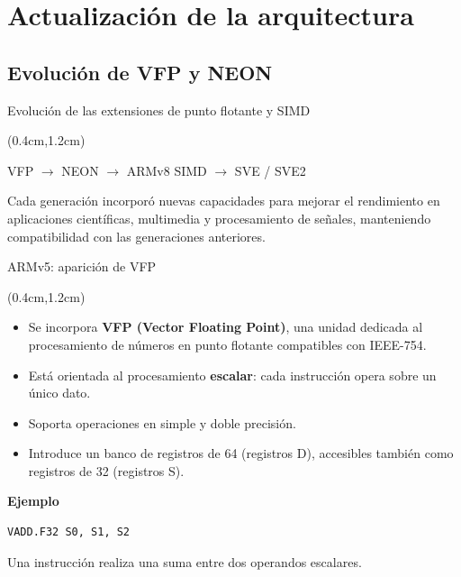 \section{Actualización de la arquitectura}
\subsection{Evolución de VFP y NEON}

\begin{frame}{Evolución de las extensiones de punto flotante y SIMD}
 \begin{textblock*}{\textwidth}(0.4cm,1.2cm)
  \begin{center} \Large
VFP $\rightarrow$ NEON $\rightarrow$ ARMv8 SIMD $\rightarrow$ SVE / SVE2
  \end{center}
  \vspace{0.5cm}
  \begin{tcolorbox}[enhanced jigsaw,rounded corners, drop fuzzy shadow=ShadowColor]
   \justifying Cada generación incorporó nuevas capacidades para mejorar el rendimiento en aplicaciones científicas, multimedia y procesamiento de señales, manteniendo compatibilidad con las generaciones anteriores.
  \end{tcolorbox}
 \end{textblock*}
\end{frame}


\begin{frame}[fragile]{ARMv5: aparición de VFP}
 \begin{textblock*}{\textwidth}(0.4cm,1.2cm)
  \begin{itemize}\justifying
   \item Se incorpora \textbf{VFP (Vector Floating Point)}, una unidad dedicada al procesamiento de números en punto flotante compatibles con IEEE-754.
   \item Está orientada al procesamiento \textbf{escalar}: cada instrucción opera sobre un único dato.
   \item Soporta operaciones en simple y doble precisión.
   \item Introduce un banco de registros de \SI{64}{\bit} (registros D), accesibles también como registros de \SI{32}{\bit} (registros S).
  \end{itemize}
  \vspace{0.3cm}
  \textbf{Ejemplo}
  \begin{lstlisting}[basicstyle=\scriptsize,numbers=none, escapechar=\@]
VADD.F32 S0, S1, S2
  \end{lstlisting}
  \begin{tcolorbox}[enhanced jigsaw,rounded corners, drop fuzzy shadow=ShadowColor]
   \justifying Una instrucción realiza una suma entre dos operandos escalares.
  \end{tcolorbox}
 \end{textblock*}
\end{frame}

